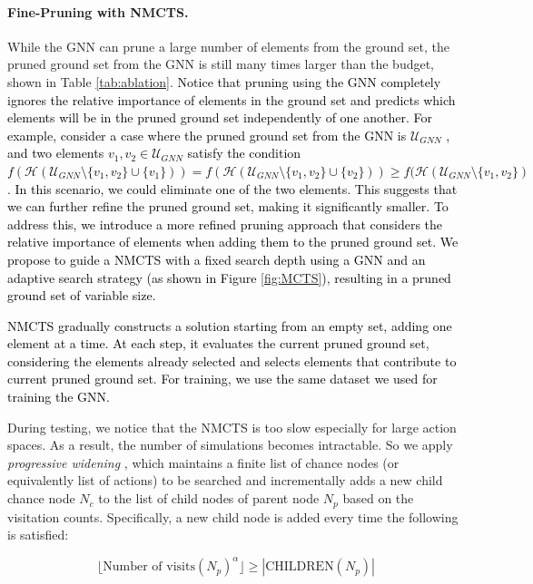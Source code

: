 \documentclass[letterpaper]{article} %
\begin{document}
\paragraph{Fine-Pruning with NMCTS.} While the GNN can prune a large number of elements from the ground set, the pruned ground set from the GNN is still many times larger than the budget, shown in Table \ref{tab:ablation}. \textcolor{black}{Notice that pruning using the GNN completely ignores the relative importance of elements in the ground set and predicts which elements will be in the pruned ground set independently of one another. For example, consider a case where the pruned ground set from the GNN is $\mathcal{U}_{\mathit{GNN}}$ , and two elements $v_1, v_2 \in \mathcal{U}_{\mathit{GNN}}$ satisfy the condition $f( \mathcal{H}(\mathcal{U}_{\mathit{GNN}} \setminus \{ v_1, v_2 \} \cup \{ v_1 \})) = f(\mathcal{H}(\mathcal{U}_{\mathit{GNN}} \setminus \{ v_1, v_2 \} \cup \{ v_2 \})) \geq f(\mathcal{H}(\mathcal{U}_{\mathit{GNN}} \setminus \{ v_1, v_2 \})$. In this scenario, we could eliminate one of the two elements. This suggests that we can further refine the pruned ground set, making it significantly smaller. To address this, we introduce a more refined pruning approach that considers the relative importance of elements when adding them to the pruned ground set. We propose to guide a NMCTS with a fixed search depth using a GNN and an adaptive search strategy (as shown in Figure \ref{fig:MCTS}), resulting in a pruned ground set of variable size.}

\textcolor{black}{NMCTS gradually constructs a solution starting from an empty set, adding one element at a time. At each step, it evaluates the current pruned ground set, considering the elements already selected and selects elements that contribute to current pruned ground set. For training, we use the same dataset we used for training the GNN.}




During testing, we notice that the NMCTS is too slow especially for large action spaces. As a result, the number of simulations becomes intractable. So we apply \textit{progressive widening} \cite{coulom2007computing,couetoux2011continuous}, which maintains a ﬁnite list of chance
nodes (or equivalently list of actions) to be searched and
incrementally adds a new child chance node $N_c$ to the list of child nodes of parent node $N_p$ based on the visitation counts. Speciﬁcally, a new child node is added every time the following is satisﬁed:


\[ \lfloor \text{Number of visits}(N_p)^\alpha \rfloor \geq | \text{CHILDREN} (N_p)| \]
\end{document}
